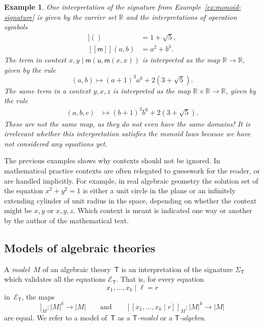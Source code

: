 \documentclass{amsart}
\newcommand{\RR}{\mathbb{R}} %
\newcommand{\theory}[1]{\mathsf{#1}} %
\newcommand{\signature}[1]{\Sigma_{\theory{#1}}} %
\newcommand{\equations}[1]{\mathcal{E}_{\theory{#1}}} %
\newcommand{\carrier}[1]{|#1|} %
\newcommand{\sem}[1]{[\![#1]\!]} %
\newtheorem{example}[definition]{Example}
\begin{document}
\begin{example}
  One interpretation of the signature from Example~\ref{ex:monoid-signature} is given by
  the carrier set $\RR$ and the interpretations of operation symbols
  \begin{align*}
    \sem{\mathsf{u}}() &= 1 + \sqrt{5}, \\
    \sem{\mathsf{m}}(a, b) &= a^2 + b^3.
  \end{align*}
  The term in context $x, y \mid \mathsf{m}(\mathsf{u}, \mathsf{m}(x, x))$ is interpreted
  as the map $\RR \to \RR$, given by the rule
  \begin{equation*}
    (a, b) \mapsto (a+1)^3 a^6 + 2 (3 + \sqrt{5}).
  \end{equation*}
  The same term in a context $y, x, z$ is interpreted as the map $\RR \times \RR \to \RR$,
  given by the rule
  \begin{align*}
    (a, b, c) &\mapsto (b+1)^3 b^6 + 2 (3 + \sqrt{5}).
  \end{align*}
  These are not the same map, as they do not even have the same domains! It is irrelevant
  whether this interpretation satisfies the monoid laws because we have not considered any
  equations yet.
\end{example}

The previous examples shows why contexts should not be ignored. In mathematical practice
contexts are often relegated to guesswork for the reader, or are handled implicitly. For
example, in real algebraic geometry the solution set of the equation $x^2 + y^2 = 1$ is
either a unit circle in the plane or an infinitely extending cylinder of unit radius in
the space, depending on whether the context might be $x, y$ or $x, y, z$. Which context is
meant is indicated one way or another by the author of the mathematical text.

\subsection{Models of algebraic theories}
\label{sec:models-algebr-theor}

A \emph{model~$M$} of an algebraic theory~$\theory{T}$ is an interpretation of the signature
$\signature{T}$ which validates all the equations $\equations{T}$. That is, for every
equation
%
\begin{equation*}
  x_1, \ldots, x_k \mid \ell = r
\end{equation*}
%
in~$\equations{T}$, the maps
%
\begin{equation*}
  \sem{x_1, \ldots, x_k \mid \ell}_M : \carrier{M}^k \to \carrier{M}
  \qquad\text{and}\qquad
  \sem{x_1, \ldots, x_k \mid r}_M : \carrier{M}^k \to \carrier{M}
\end{equation*}
%
are equal. We refer to a model of~$\theory{T}$ as a \emph{$\theory{T}$-model} or
a \emph{$\theory{T}$-algebra}.
\end{document}
